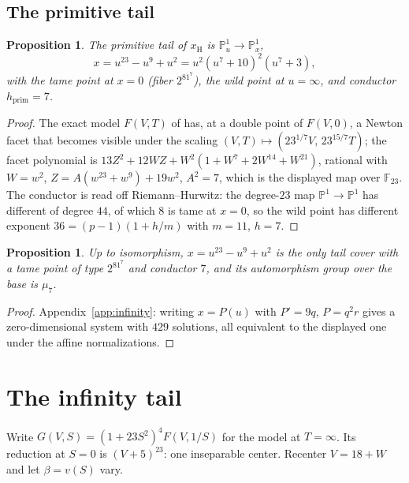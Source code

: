\documentclass[11pt]{amsart}
\newcommand{\FF}{\mathbb{F}}
\newcommand{\PP}{\mathbb{P}}
\newcommand{\xH}{x_{\mathrm H}}
\theoremstyle{plain}
\newtheorem{proposition}[theorem]{Proposition}
\theoremstyle{definition}
\begin{document}
\subsection{The primitive tail}\label{sec:primtail}

\begin{proposition}\label{prop:prim}
The primitive tail of $\xH$ is $\PP^1_u\to\PP^1_x$,
\[
  x=u^{23}-u^9+u^2=u^2(u^7+10)^2(u^7+3),
\]
with the tame point at $x=0$ (fiber $2^81^7$), the wild point at
$u=\infty$, and conductor $h_{\mathrm{prim}}=7$.
\end{proposition}
\begin{proof}
The exact model $F(V,T)$ of \cite{HJLPPZ} has, at a double point of
$F(V,0)$, a Newton facet that becomes visible under the scaling
$(V,T)\mapsto(23^{1/7}V,\,23^{15/7}T)$; the facet polynomial is
$13Z^2+12WZ+W^2(1+W^7+2W^{14}+W^{21})$, rational with $W=w^2$,
$Z=A(w^{23}+w^9)+19w^2$, $A^2=7$, which is the displayed map over
$\FF_{23}$. The conductor is read off Riemann--Hurwitz: the degree-$23$
map $\PP^1\to\PP^1$ has different of degree $44$, of which $8$ is tame
at $x=0$, so the wild point has different exponent
$36=(p-1)(1+h/m)$ with $m=11$, $h=7$.
\end{proof}

\begin{proposition}\label{prop:primunique}
Up to isomorphism, $x=u^{23}-u^9+u^2$ is the only tail cover with a
tame point of type $2^81^7$ and conductor $7$, and its automorphism
group over the base is $\mu_7$.
\end{proposition}
\begin{proof}
Appendix~\ref{app:infinity}: writing $x=P(u)$ with $P'=9q$, $P=q^2r$
gives a zero-dimensional system with $429$ solutions, all
equivalent to the displayed one under the affine normalizations.
\end{proof}

\section{The infinity tail}\label{sec:newtail}

Write $G(V,S)=(1+23S^2)^4F(V,1/S)$ for the model at $T=\infty$. Its
reduction at $S=0$ is $(V+5)^{23}$: one inseparable center. Recenter
$V=18+W$ and let $\beta=v(S)$ vary.
\end{document}
